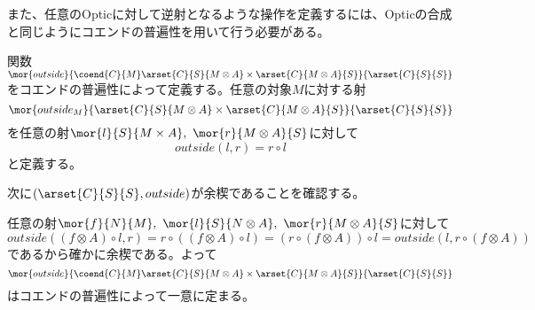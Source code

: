 \documentclass[uplatex,dvipdfmx]{jsarticle}
\begin{document}
  また、任意のOpticに対して逆射となるような操作を定義するには、Opticの合成と同じようにコエンドの普遍性を用いて行う必要がある。
  \begin{define}[outside関数]
    関数$\mor{outside}{\coend{C}{M}\arset{C}{S}{M\otimes A}\times\arset{C}{M\otimes A}{S}}{\arset{C}{S}{S}}$をコエンドの普遍性によって定義する。任意の対象$M$に対する射
    \[\mor{outside_M}{\arset{C}{S}{M\otimes A}\times\arset{C}{M\otimes A}{S}}{\arset{C}{S}{S}}\]を任意の射$\mor{l}{S}{M\times A},\ \mor{r}{M\otimes A}{S}$に対して\[outside(l,r)=r\circ l\]と定義する。

    次に$(\arset{C}{S}{S},outside)$が余楔であることを確認する。
    \begin{center}
    \end{center}
    任意の射$\mor{f}{N}{M},\ \mor{l}{S}{N\otimes A},\ \mor{r}{M\otimes A}{S}$に対して\[outside((f\otimes A)\circ l,r) = r\circ ((f\otimes A)\circ l)=(r\circ (f\otimes A))\circ l=outside(l,r\circ (f\otimes A))\]であるから確かに余楔である。よって\[\mor{outside}{\coend{C}{M}\arset{C}{S}{M\otimes A}\times\arset{C}{M\otimes A}{S}}{\arset{C}{S}{S}}\]はコエンドの普遍性によって一意に定まる。
  \end{define}
  
\end{document}
